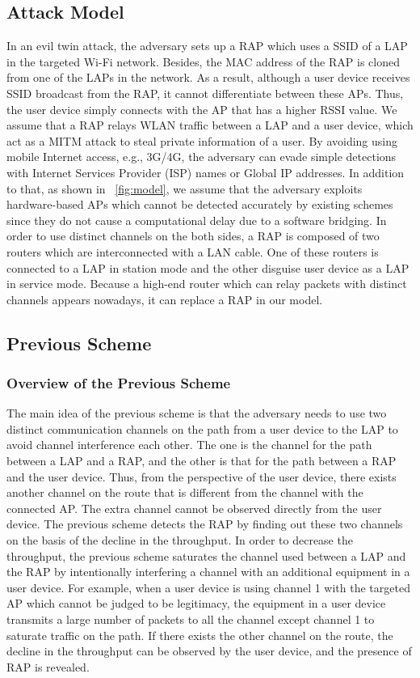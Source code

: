 \documentclass[conference]{IEEEtran}
\begin{document}
\subsection{Attack Model}
In an evil twin attack, the adversary sets up a RAP which uses a SSID of a LAP in the targeted Wi-Fi network.
Besides, the MAC address of the RAP is cloned from one of the LAPs in the network.
As a result, although a user device receives SSID broadcast from the RAP, it cannot differentiate between these APs.
Thus, the user device simply connects with the AP that has a higher RSSI value.
We assume that a RAP relays WLAN traffic between a LAP and a user device, which act as a MITM attack to steal private information of a user.
By avoiding using mobile Internet access, e.g., 3G/4G, the adversary can evade simple detections with Internet Services Provider (ISP) names or Global IP addresses\cite{rtt}.
In addition to that, as shown in \figurename~\ref{fig:model}, we assume that the adversary exploits hardware-based APs which cannot be detected accurately by existing schemes since they do not cause a computational delay due to a software bridging.
In order to use distinct channels on the both sides, a RAP is composed of two routers which are interconnected with a LAN cable.
One of these routers is connected to a LAP in station mode and the other disguise user device as a LAP in service mode.
Because a high-end router which can relay packets with distinct channels appears nowadays, it can replace a RAP in our model.

\subsection{Previous Scheme}
\subsubsection{Overview of the Previous Scheme}
The main idea of the previous scheme \cite{previous} is that the adversary needs to use two distinct communication channels on the path from a user device to the LAP to avoid channel interference each other.
The one is the channel for the path between a LAP and a RAP, and the other is that for the path between a RAP and the user device.
Thus, from the perspective of the user device, there exists another channel on the route that is different from the channel with the connected AP.
The extra channel cannot be observed directly from the user device.
The previous scheme detects the RAP by finding out these two channels on the basis of the decline in the throughput.
In order to decrease the throughput, the previous scheme saturates the channel used between a LAP and the RAP by intentionally interfering a channel with an additional equipment in a user device.
For example, when a user device is using channel 1 with the targeted AP which cannot be judged to be legitimacy, the equipment in a user device transmits a large number of packets to all the channel except channel 1 to saturate traffic on the path.
If there exists the other channel on the route, the decline in the throughput can be observed by the user device, and the presence of RAP is revealed.
\end{document}
